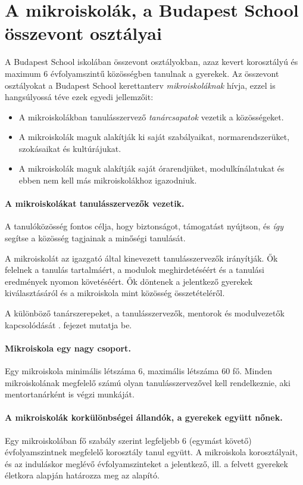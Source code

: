 \section{A mikroiskolák, a Budapest School összevont osztályai}
\label{sec:mikroiskola}

A Budapest School iskolában összevont osztályokban, azaz kevert korosztályú és
maximum 6 évfolyamszintű közösségben tanulnak a gyerekek. Az összevont
osztályokat a Budapest School kerettanterv \emph{mikroiskoláknak} hívja, ezzel
is
hangsúlyossá téve ezek egyedi jellemzőit:
\begin{itemize}
      \item A mikroiskolákban  tanulásszervező	\emph{tanárcsapatok} vezetik a
            közösségeket.
      \item A mikroiskolák maguk alakítják ki saját szabályaikat, normarendszerüket, szokásaikat és
            kultúrájukat.
      \item A mikroiskolák maguk alakítják saját órarendjüket, modulkínálatukat
            és ebben nem kell más mikroiskolákhoz igazodniuk.
\end{itemize}

\paragraph{A mikroiskolákat tanulásszervezők vezetik.}

A tanulóközösség fontos célja, hogy biztonságot, támogatást nyújtson, és
\emph{így} segítse a közösség tagjainak a minőségi tanulását.

A mikroiskolát az igazgató által kinevezett tanulásszervezők irányítják.
Ők felelnek a tanulás tartalmáért, a modulok meghirdetéséért és a
tanulási eredmények nyomon követéséért. Ők döntenek a jelentkező gyerekek
kiválasztásáról és a mikroiskola mint közösség összetételéről.

A különböző tanárszerepeket, a tanulásszervezők, mentorok és modulvezetők
kapcsolódását . fejezet mutatja be.

\paragraph{Mikroiskola egy nagy csoport.}

Egy mikroiskola minimális létszáma 6, maximális létszáma 60 fő. Minden
mikroiskolának megfelelő számú olyan tanulásszervezővel kell
rendelkeznie, aki mentortanárként is végzi munkáját.

\paragraph{A mikroiskolák korkülönbségei állandók, a gyerekek együtt nőnek.}
Egy mikroiskolában fő szabály szerint legfeljebb 6 (egymást követő)
évfolyamszintnek megfelelő korosztály tanul együtt. A mikroiskola
korosztályait, és az induláskor meglévő évfolyamszinteket a jelentkező, ill. a
felvett gyerekek életkora alapján határozza meg az alapító.

